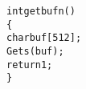\begin{alltt}
int getbufn()
\verb:{:
    char buf[512];
    Gets(buf);
    return 1;
\verb:}:
\end{alltt}
